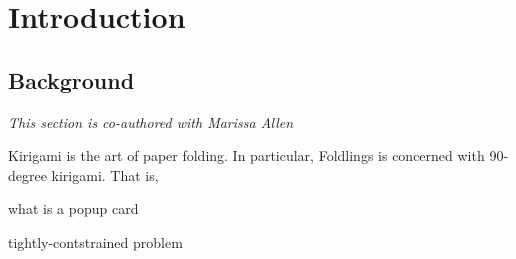 \chapter{Introduction}

\section{Background}\label{background}

\emph{This section is co-authored with Marissa Allen}

Kirigami is the art of paper folding. In particular, Foldlings is
concerned with 90-degree kirigami. That is,

what is a popup card

tightly-contstrained problem
